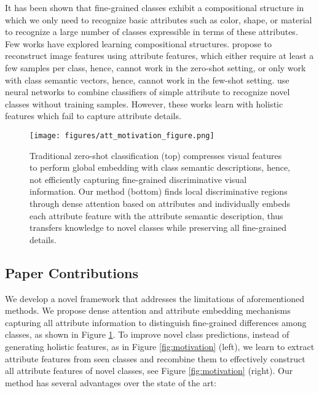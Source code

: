 \documentclass[10pt,journal,compsoc]{IEEEtran}
\newcommand{\1}{\boldsymbol{1}}
\newcommand{\0}{\boldsymbol{0}}
\newcommand{\<}{\langle}
\renewcommand{\>}{\rangle}
\begin{document}
It has been shown that fine-grained classes exhibit a compositional structure \cite{Sylvain:ICLR20} in which we only need to recognize basic attributes such as color, shape, or material to recognize a large number of classes expressible in terms of these attributes. 
Few works have explored learning compositional structures.
\cite{Tokmakov:ICCV19,Atzmon:NeurIPS20, Huynh:NeurIPS20} propose to reconstruct image features using attribute features, which either require at least a few samples per class, hence, cannot work in the zero-shot setting, or only work with class semantic vectors, hence, cannot work in the few-shot setting. \cite{Misra:CVPR17,Kato:ECCV18} use neural networks to combine classifiers of simple attribute to recognize novel classes without training samples.
However, these works learn with holistic features which fail to capture attribute details.

\begin{figure}[t]
\centering
\texttt{[image: figures/att\_motivation\_figure.png]}
\vspace{-0mm}
\caption{
\small{Traditional zero-shot classification (top) compresses visual features to perform global embedding with class semantic descriptions, hence, not efficiently capturing fine-grained discriminative visual information. Our method (bottom) finds local discriminative regions through dense attention based on attributes and individually embeds each attribute feature with the attribute semantic description, thus transfers knowledge to novel classes while preserving all fine-grained details.
}
}
\label{fig:dense_attention_motivation}
\vspace{-3mm}
\end{figure}


\subsection{Paper Contributions} We develop a novel framework that addresses the limitations of aforementioned methods. 
We propose dense attention and attribute embedding mechanisms capturing all attribute information to distinguish fine-grained differences among classes, as shown in Figure \ref{fig:dense_attention_motivation}.
To improve novel class predictions, instead of generating holistic features, as in Figure \ref{fig:motivation} (left), we learn to extract attribute features from seen classes and recombine them to effectively construct all attribute features of novel classes, see Figure \ref{fig:motivation} (right). 
Our method has several advantages over the state of the art:
\end{document}
